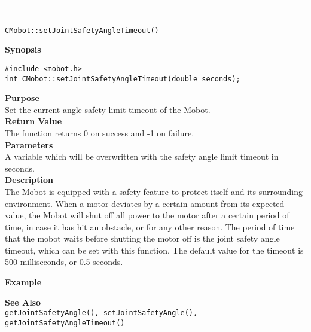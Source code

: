 \noindent
\vspace{5pt}
\rule{4.5in}{0.015in}\\
\noindent
{\LARGE \texttt{CMobot::setJointSafetyAngleTimeout()}}\\
{}

\noindent
{\bf Synopsis}
\vspace{-8pt}
\begin{verbatim}
#include <mobot.h>
int CMobot::setJointSafetyAngleTimeout(double seconds);
\end{verbatim}

\noindent
{\bf Purpose}\\
Set the current angle safety limit timeout of the Mobot.\\

\noindent
{\bf Return Value}\\
The function returns 0 on success and -1 on failure.\\

\noindent
{\bf Parameters}\\
A variable which will be overwritten with the safety angle limit timeout in seconds.\\

\noindent
{\bf Description}\\
The Mobot is equipped with a safety feature to protect itself and its surrounding
environment. When a motor deviates by a certain amount from its expected value, 
the Mobot will shut off all power to the motor after a certain period of time,
in case it has hit an obstacle, or for any other reason. The period of time that the
mobot waits before shutting the motor off is the joint safety angle timeout, which
can be set with this function. The default value for the timeout is 500 milliseconds,
or 0.5 seconds.
 
\noindent
{\bf Example}\\
\noindent

\noindent
{\bf See Also}\\
\texttt{getJointSafetyAngle(), setJointSafetyAngle(), getJointSafetyAngleTimeout()}\\



